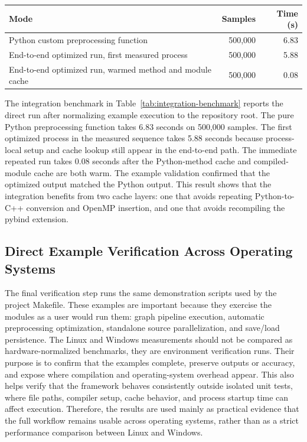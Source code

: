 \documentclass[12pt,a4paper,oneside]{report}
\newcommand{\besttime}{\cellcolor{green!20}}
\begin{document}
\begin{center}
\label{tab:integration-benchmark}
\normalsize
\begin{tabularx}{\linewidth}{Xrr}
\toprule
Mode & Samples & Time (s) \\
\midrule
Python custom preprocessing function & 500,000 & 6.83 \\
End-to-end optimized run, first measured process & 500,000 & 5.88 \\
End-to-end optimized run, warmed method and module cache & 500,000 & \besttime 0.08 \\
\bottomrule
\end{tabularx}
\end{center}

The integration benchmark in Table~\ref{tab:integration-benchmark} reports the
direct  run after normalizing example
execution to the repository root. The pure Python preprocessing function takes 6.83
seconds on 500,000 samples. The first optimized process in the measured
sequence takes 5.88 seconds because process-local setup and cache lookup still
appear in the end-to-end path. The immediate repeated run takes 0.08 seconds
after the Python-method cache and compiled-module cache are both warm. The
example validation confirmed that the optimized output matched the Python
output. This result shows that the integration benefits from two cache layers:
one that avoids repeating Python-to-C++ conversion and OpenMP insertion, and
one that avoids recompiling the pybind extension.

\FloatBarrier

\subsection{Direct Example Verification Across Operating Systems}

The final verification step runs the same demonstration scripts used by the project Makefile.
These examples are important because they exercise the modules as a user would run
them: graph pipeline execution, automatic preprocessing optimization, standalone source
parallelization, and save/load persistence. The Linux and Windows measurements should
not be compared as hardware-normalized benchmarks, they are environment verification
runs. Their purpose is to confirm that the examples complete, preserve outputs or accuracy,
and expose where compilation and operating-system overhead appear. This also helps verify
that the framework behaves consistently outside isolated unit tests, where file paths,
compiler setup, cache behavior, and process startup time can affect execution. Therefore,
the results are used mainly as practical evidence that the full workflow remains usable
across operating systems, rather than as a strict performance comparison between Linux
and Windows.
\end{document}
